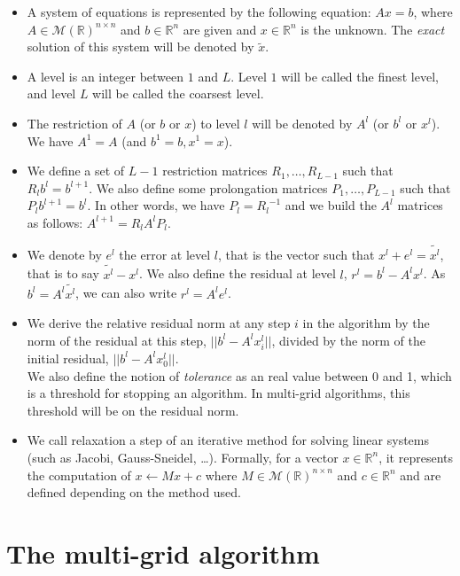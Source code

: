 \documentclass[sigplan]{acmart}
\begin{document}
\begin{itemize}
 \item A system of equations is represented by the following equation: $Ax=b$, where $A \in \mathcal{M}(\mathbb{R})^{n\times n}$ and $b \in \mathcal{\mathbb{R}}^n$ are given and
 $x \in \mathbb{R}^n$ is the unknown. The \emph{exact} solution of this system will be denoted by $\widetilde{x}$.
 \item A level is an integer between $1$ and $L$. Level $1$ will be called the finest level, and level $L$ will be called the coarsest level.
 \item The restriction of $A$ (or $b$ or $x$) to level $l$ will be denoted by $A^l$ (or $b^l$ or $x^l$). We have $A^1 = A$ (and $b^1=b,x^1=x$).
 \item We define a set of $L-1$ restriction matrices $R_1,\dots,R_{L-1}$ such that $R_l b^l = b^{l+1}$. We also define some prolongation matrices $P_1,\dots,P_{L-1}$ such that $P_{l}b^{l+1} = b^l$.
 In other words, we have $P_l = {R_l}^{-1}$ and we build the $A^l$ matrices as follows: $A^{l+1} = R_l A^l P_l$.
 \item We denote by $e^l$ the error at level $l$, that is the vector such that $x^l + e^l = \widetilde{x^l}$, that is to say $\widetilde{x^l}-x^l$.
 We also define the residual at level $l$, $r^l = b^l - A^lx^l$. As $b^l = A^l\widetilde{x^l}$, we can also write $r^l = A^le^l$.
 \item We derive the relative residual norm at any step $i$ in the algorithm
 by the norm of the residual at this step, $||b^l - A^lx^l_i||$, divided by the norm of the initial residual, $|| b^l - A^lx^l_0||$.\\ We also define the notion of \emph{tolerance}
 as an real value between 0 and 1, which is a threshold for stopping an algorithm. In multi-grid algorithms, this threshold will be on the residual norm.
 \item We call relaxation a step of an iterative method for solving linear systems (such as Jacobi, Gauss-Sneidel, \dots). Formally, for a vector $x \in \mathbb{R}^n$, it represents the computation of
 $x \leftarrow Mx + c$ where $M \in \mathcal{M}(\mathbb{R})^{n\times n}$ and $c \in \mathcal{\mathbb{R}}^n$ and are defined depending on the method used.
\end{itemize}

\section{The multi-grid algorithm}
\end{document}
